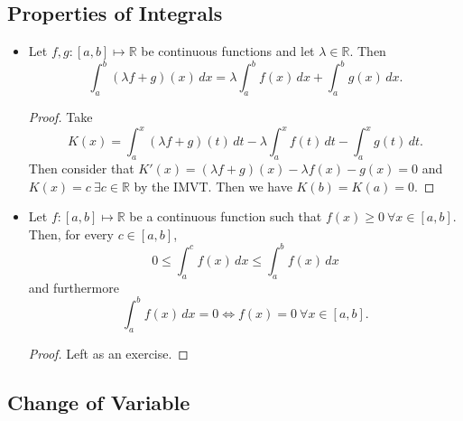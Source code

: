 \documentclass{article}
\newcommand{\R}{\mathbb{R}}
\newcommand{\?}{\stackrel{?}{=}}
\theoremstyle{definition} %
\begin{document}
\subsection{Properties of Integrals}

\begin{itemize}
    \item[]
    \begin{lemma}
        Let $f, g: [a, b] \mapsto \R$ be continuous functions and let $\lambda \in \R$. Then
        $$\int_a^b (\lambda f + g)(x) \,dx = \lambda \int_a^b f(x) \,dx + \int_a^b g(x) \,dx.$$
    \end{lemma}
    \begin{proof}
        Take
        $$K(x) = \int_a^x (\lambda f + g)(t) \,dt - \lambda \int_a^x f(t) \,dt - \int_a^x g(t) \,dt.$$
        Then consider that $K'(x) = (\lambda f + g)(x) - \lambda f(x) - g(x) = 0$ and $K(x) = c \ \exists c \in \R$ by the IMVT. Then we have $K(b) = K(a) = 0$.
    \end{proof}
    \item[]
    \begin{lemma}
        Let $f: [a, b] \mapsto \R$ be a continuous function such that $f(x) \geq 0 \ \forall x \in [a, b]$. Then, for every $c \in [a, b]$,
        $$0 \leq \int_a^c f(x) \,dx \leq \int_a^b f(x) \,dx$$
        and furthermore
        $$\int_a^b f(x) \,dx = 0 \iff f(x) = 0 \ \forall x \in [a, b].$$
    \end{lemma}
    \begin{proof}
        Left as an exercise.
    \end{proof}
\end{itemize}

\subsection{Change of Variable}
\end{document}
